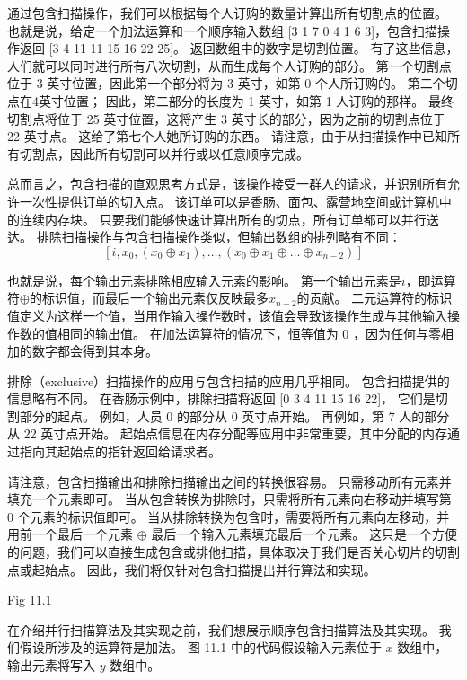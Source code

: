 通过包含扫描操作，我们可以根据每个人订购的数量计算出所有切割点的位置。 
也就是说，给定一个加法运算和一个顺序输入数组 [3 1 7 0 4 1 6 3]，包含扫描操作返回 
[3 4 11 11 15 16 22 25]。 返回数组中的数字是切割位置。 
有了这些信息，人们就可以同时进行所有八次切割，从而生成每个人订购的部分。 
第一个切割点位于 3 英寸位置，因此第一个部分将为 3 英寸，如第 0 个人所订购的。 
第二个切点在4英寸位置； 因此，第二部分的长度为 1 英寸，如第 1 人订购的那样。 
最终切割点将位于 25 英寸位置，这将产生 3 英寸长的部分，因为之前的切割点位于 22 英寸点。 
这给了第七个人她所订购的东西。 请注意，由于从扫描操作中已知所有切割点，因此所有切割可以并行或以任意顺序完成。

总而言之，包含扫描的直观思考方式是，该操作接受一群人的请求，并识别所有允许一次性提供订单的切入点。 
该订单可以是香肠、面包、露营地空间或计算机中的连续内存块。 
只要我们能够快速计算出所有的切点，所有订单都可以并行送达。 排除扫描操作与包含扫描操作类似，但输出数组的排列略有不同：
$$
\left[i, x_{0},\left(x_{0} \oplus x_{1}\right), \ldots,\left(x_{0} \oplus x_{1} \oplus \ldots \oplus x_ {n-2}\right)\right]
$$

也就是说，每个输出元素排除相应输入元素的影响。 
第一个输出元素是$i$，即运算符$\oplus$的标识值，而最后一个输出元素仅反映最多$x_{n-2}$的贡献。 
二元运算符的标识值定义为这样一个值，当用作输入操作数时，该值会导致该操作生成与其他输入操作数的值相同的输出值。 
在加法运算符的情况下，恒等值为 0 ，因为任何与零相加的数字都会得到其本身。

排除（exclusive）扫描操作的应用与包含扫描的应用几乎相同。 包含扫描提供的信息略有不同。 
在香肠示例中，排除扫描将返回 [0 3 4 11 15 16 22]，
它们是切割部分的起点。 例如，人员 0 的部分从 0 英寸点开始。 再例如，第 7 人的部分从 22 英寸点开始。 
起始点信息在内存分配等应用中非常重要，其中分配的内存通过指向其起始点的指针返回给请求者。

请注意，包含扫描输出和排除扫描输出之间的转换很容易。 只需移动所有元素并填充一个元素即可。 
当从包含转换为排除时，只需将所有元素向右移动并填写第 0 个元素的标识值即可。 
当从排除转换为包含时，需要将所有元素向左移动，并用前一个最后一个元素 $\oplus$ 最后一个输入元素填充最后一个元素。 
这只是一个方便的问题，我们可以直接生成包含或排他扫描，具体取决于我们是否关心切片的切割点或起始点。 
因此，我们将仅针对包含扫描提出并行算法和实现。

{\color{red} Fig 11.1}

在介绍并行扫描算法及其实现之前，我们想展示顺序包含扫描算法及其实现。 我们假设所涉及的运算符是加法。 
图 11.1 中的代码假设输入元素位于 $x$ 数组中，输出元素将写入 $y$ 数组中。

